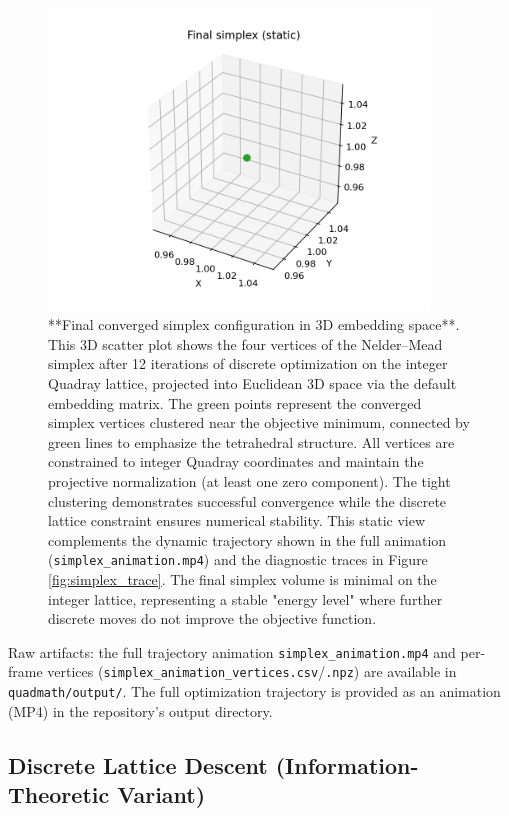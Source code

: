 \documentclass[
  10pt,
]{article}
\begin{document}
\begin{figure}[htbp]
\centering
\includegraphics[width=0.9\textwidth]{figures/simplex_final.png}
\caption{**Final converged simplex configuration in 3D embedding space**. This 3D scatter plot shows the four vertices of the Nelder–Mead simplex after 12 iterations of discrete optimization on the integer Quadray lattice, projected into Euclidean 3D space via the default embedding matrix. The green points represent the converged simplex vertices clustered near the objective minimum, connected by green lines to emphasize the tetrahedral structure. All vertices are constrained to integer Quadray coordinates and maintain the projective normalization (at least one zero component). The tight clustering demonstrates successful convergence while the discrete lattice constraint ensures numerical stability. This static view complements the dynamic trajectory shown in the full animation (\texttt{simplex\_animation.mp4}) and the diagnostic traces in Figure \ref{fig:simplex_trace}. The final simplex volume is minimal on the integer lattice, representing a stable "energy level" where further discrete moves do not improve the objective function.}
\label{fig:simplex_final}
\end{figure}

Raw artifacts: the full trajectory animation
\texttt{simplex\_animation.mp4} and per-frame vertices
(\texttt{simplex\_animation\_vertices.csv}/\texttt{.npz}) are available
in \texttt{quadmath/output/}. The full optimization trajectory is
provided as an animation (MP4) in the repository's output directory.

\hypertarget{discrete-lattice-descent-information-theoretic-variant}{%
\subsection{Discrete Lattice Descent (Information-Theoretic
Variant)}\label{discrete-lattice-descent-information-theoretic-variant}}
\end{document}
